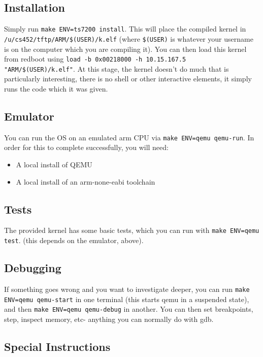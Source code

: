 \subsection{Installation}\label{installation}

Simply run \texttt{make ENV=ts7200 install}. This will place the
compiled kernel in \texttt{/u/cs452/tftp/ARM/\$(USER)/k.elf} (where
\texttt{\$(USER)} is whatever your username is on the computer which you
are compiling it). You can then load this kernel from redboot using
\texttt{load -b 0x00218000 -h 10.15.167.5 "ARM/\$(USER)/k.elf"}. At this
stage, the kernel doesn't do much that is particularly interesting,
there is no shell or other interactive elements, it simply runs the code
which it was given.

\subsection{Emulator}\label{emulator}

You can run the OS on an emulated arm CPU via
\texttt{make ENV=qemu qemu-run}. In order for this to complete
successfully, you will need:

\begin{itemize}
\itemsep1pt\parskip0pt
\item
  A local install of QEMU
\item
  A local install of an arm-none-eabi toolchain
\end{itemize}

\subsection{Tests}\label{tests}

The provided kernel has some basic tests, which you can run with
\texttt{make ENV=qemu test}. (this depends on the emulator, above).

\subsection{Debugging}\label{debugging}

If something goes wrong and you want to investigate deeper, you can run
\texttt{make ENV=qemu qemu-start} in one terminal (this starts qemu in a
suspended state), and then \texttt{make ENV=qemu qemu-debug} in another.
You can then set breakpoints, step, inspect memory, etc- anything you
can normally do with gdb.

\subsection{Special Instructions}\label{special-instructions}

